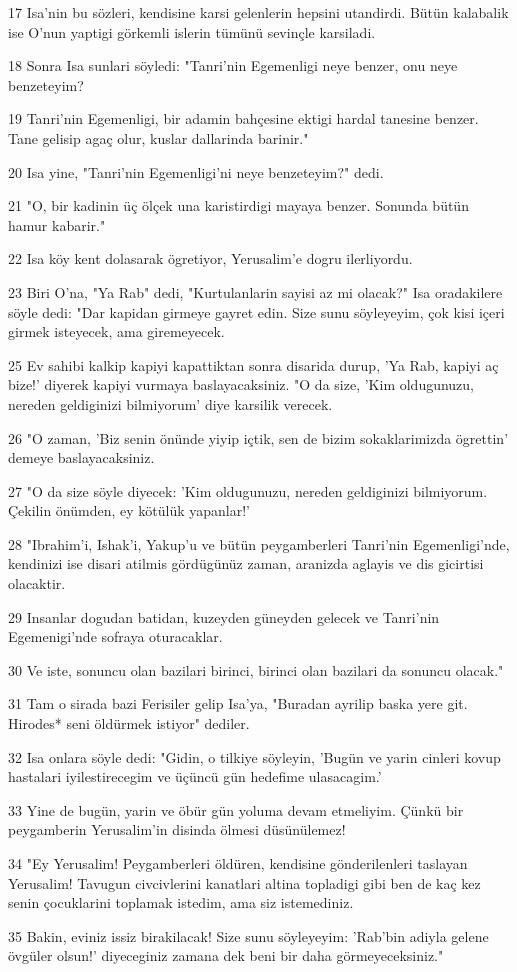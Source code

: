 \par 17 Isa'nin bu sözleri, kendisine karsi gelenlerin hepsini utandirdi. Bütün kalabalik ise O'nun yaptigi görkemli islerin tümünü sevinçle karsiladi.
\par 18 Sonra Isa sunlari söyledi: "Tanri'nin Egemenligi neye benzer, onu neye benzeteyim?
\par 19 Tanri'nin Egemenligi, bir adamin bahçesine ektigi hardal tanesine benzer. Tane gelisip agaç olur, kuslar dallarinda barinir."
\par 20 Isa yine, "Tanri'nin Egemenligi'ni neye benzeteyim?" dedi.
\par 21 "O, bir kadinin üç ölçek una karistirdigi mayaya benzer. Sonunda bütün hamur kabarir."
\par 22 Isa köy kent dolasarak ögretiyor, Yerusalim'e dogru ilerliyordu.
\par 23 Biri O'na, "Ya Rab" dedi, "Kurtulanlarin sayisi az mi olacak?" Isa oradakilere söyle dedi: "Dar kapidan girmeye gayret edin. Size sunu söyleyeyim, çok kisi içeri girmek isteyecek, ama giremeyecek.
\par 25 Ev sahibi kalkip kapiyi kapattiktan sonra disarida durup, 'Ya Rab, kapiyi aç bize!' diyerek kapiyi vurmaya baslayacaksiniz. "O da size, 'Kim oldugunuzu, nereden geldiginizi bilmiyorum' diye karsilik verecek.
\par 26 "O zaman, 'Biz senin önünde yiyip içtik, sen de bizim sokaklarimizda ögrettin' demeye baslayacaksiniz.
\par 27 "O da size söyle diyecek: 'Kim oldugunuzu, nereden geldiginizi bilmiyorum. Çekilin önümden, ey kötülük yapanlar!'
\par 28 "Ibrahim'i, Ishak'i, Yakup'u ve bütün peygamberleri Tanri'nin Egemenligi'nde, kendinizi ise disari atilmis gördügünüz zaman, aranizda aglayis ve dis gicirtisi olacaktir.
\par 29 Insanlar dogudan batidan, kuzeyden güneyden gelecek ve Tanri'nin Egemenigi'nde sofraya oturacaklar.
\par 30 Ve iste, sonuncu olan bazilari birinci, birinci olan bazilari da sonuncu olacak."
\par 31 Tam o sirada bazi Ferisiler gelip Isa'ya, "Buradan ayrilip baska yere git. Hirodes* seni öldürmek istiyor" dediler.
\par 32 Isa onlara söyle dedi: "Gidin, o tilkiye söyleyin, 'Bugün ve yarin cinleri kovup hastalari iyilestirecegim ve üçüncü gün hedefime ulasacagim.'
\par 33 Yine de bugün, yarin ve öbür gün yoluma devam etmeliyim. Çünkü bir peygamberin Yerusalim'in disinda ölmesi düsünülemez!
\par 34 "Ey Yerusalim! Peygamberleri öldüren, kendisine gönderilenleri taslayan Yerusalim! Tavugun civcivlerini kanatlari altina topladigi gibi ben de kaç kez senin çocuklarini toplamak istedim, ama siz istemediniz.
\par 35 Bakin, eviniz issiz birakilacak! Size sunu söyleyeyim: 'Rab'bin adiyla gelene övgüler olsun!' diyeceginiz zamana dek beni bir daha görmeyeceksiniz."

